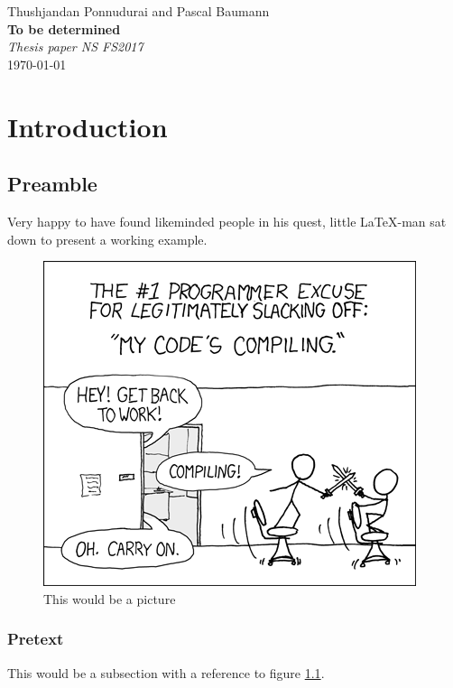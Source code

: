 \documentclass[a4paper]{report}
\newcommand*{\titleAP}{\begingroup %
	\centering
	\vspace*{\baselineskip} %
	
	{\Large Thushjandan Ponnudurai} and {\Large Pascal Baumann}\\[0.167\textheight] %
	
	{\Huge\bfseries To be determined}\\[\baselineskip]
	
	{\Large \textit{Thesis paper NS FS2017}}\\
	\today
	
	\vspace*{3\baselineskip} %
	\endgroup}
\begin{document}
\titleAP

\newpage

\tableofcontents

\newpage

\chapter{Introduction}

\section{Preamble}
Very happy to have found likeminded people in his quest, little \LaTeX-man sat down to present a working example. \parencite{Baumann2017}

\begin{figure}[htb]
	\centering
	\includegraphics[keepaspectratio=true,height=8\baselineskip]{compiling.png}
	\caption{This would be a picture}
	\label{fig:xkcd_compiling}
\end{figure}

\subsection{Pretext}
This would be a subsection with a reference to figure \ref{fig:xkcd_compiling}.

\newpage

\printbibliography
\end{document}
